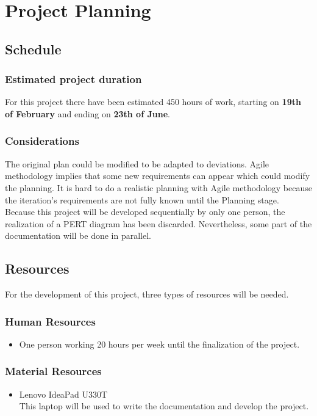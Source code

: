 \chapter{Project Planning}
\label{Chapter3}

\section{Schedule}
\subsection{Estimated project duration}
For this project there have been estimated 450 hours of work, starting on \textbf{19th of February} and ending on \textbf{23th of June}.\\

\subsection{Considerations}
The original plan could be modified to be adapted to deviations. Agile methodology implies that some new requirements can appear which could modify the planning. It is hard to do a realistic planning with Agile methodology because the iteration's requirements are not fully known until the Planning stage.\\

Because this project will be developed sequentially by only one person, the realization of a PERT diagram has been discarded. Nevertheless, some part of the documentation will be done in parallel.

\section{Resources}
For the development of this project, three types of resources will be needed.
\subsection{Human Resources}
\begin{itemize}
	\item One person working 20 hours per week until the finalization of the project.
\end{itemize}
\subsection{Material Resources}
\begin{itemize}
	\item Lenovo IdeaPad U330T\\
	This laptop will be used to write the documentation and develop the project.
\end{itemize}
